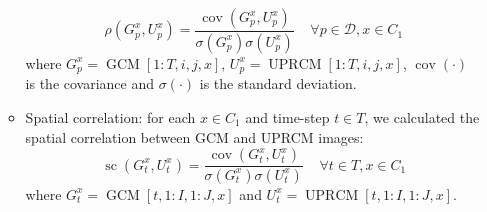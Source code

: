 \documentclass[a4paper,11pt,oneside]{report}
\begin{document}
\begin{itemize}
\begin{itemize}
        \begin{equation}\label{eq:temporal-corr}
            \rho\left(G_{p}^x,U_{p}^x\right) = \frac{\operatorname{cov}(G_{p}^x,U_{p}^x)}{\sigma(G_{p}^x)\sigma(U_{p}^x)} \;\;\;\; \forall p \in \mathcal{D}, x\in C_1 
        \end{equation}
        where $G_{p}^x = \operatorname{GCM}[1:T, i, j, x]$, $U_{p}^x = \operatorname{UPRCM}[1:T, i, j, x]$, $\operatorname {cov}(\cdot)$  is the covariance and  $\sigma(\cdot)$ is the standard deviation.  
        \item Spatial correlation: for each $x\in C_1$ and time-step $t \in T$, we calculated the spatial correlation between GCM and UPRCM images: 
        \begin{equation}\label{eq:spatial-corr}
            \operatorname{sc}\left(G_{t}^x,U_{t}^x\right) = \frac{\operatorname{cov}(G_{t}^x,U_{t}^x)}{\sigma(G_{t}^x)\sigma(U_{t}^x)} \;\;\;\; \forall t \in T, x\in C_1 
        \end{equation}
        where $G_{t}^x = \operatorname{GCM}[t,1:I,1:J,x]$ and $U_{t}^x =\operatorname{UPRCM}[t,1:I,1:J,x]$. 
    \end{itemize}
\end{itemize}
\end{document}
